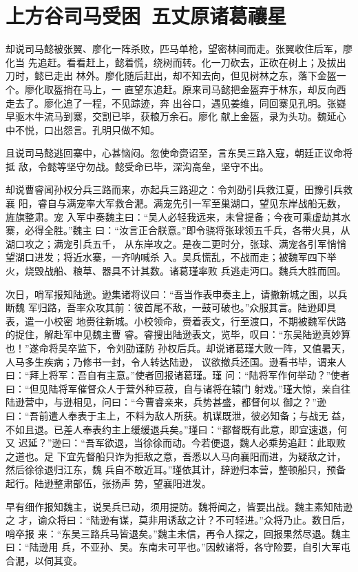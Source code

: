 \chapter{上方谷司马受困~五丈原诸葛禳星}

却说司马懿被张翼、廖化一阵杀败，匹马单枪，望密林间而走。张翼收住后军，廖化当
先追赶。看看赶上，懿着慌，绕树而转。化一刀砍去，正砍在树上；及拔出刀时，懿已走出
林外。廖化随后赶出，却不知去向，但见树林之东，落下金盔一个。廖化取盔捎在马上，一
直望东追赶。原来司马懿把金盔弃于林东，却反向西走去了。廖化追了一程，不见踪迹，奔
出谷口，遇见姜维，同回寨见孔明。张嶷早驱木牛流马到寨，交割已毕，获粮万余石。廖化
献上金盔，录为头功。魏延心中不悦，口出怨言。孔明只做不知。

且说司马懿逃回寨中，心甚恼闷。忽使命赍诏至，言东吴三路入寇，朝廷正议命将抵
敌，令懿等坚守勿战。懿受命已毕，深沟高垒，坚守不出。

却说曹睿闻孙权分兵三路而来，亦起兵三路迎之：令刘劭引兵救江夏，田豫引兵救襄
阳，睿自与满宠率大军救合淝。满宠先引一军至巢湖口，望见东岸战船无数，旌旗整肃。宠
入军中奏魏主曰：“吴人必轻我远来，未曾提备；今夜可乘虚劫其水寨，必得全胜。”魏主
曰：“汝言正合朕意。”即令骁将张球领五千兵，各带火具，从湖口攻之；满宠引兵五千，
从东岸攻之。是夜二更时分，张球、满宠各引军悄悄望湖口进发；将近水寨，一齐呐喊杀
入。吴兵慌乱，不战而走；被魏军四下举火，烧毁战船、粮草、器具不计其数。诸葛瑾率败
兵逃走沔口。魏兵大胜而回。

次日，哨军报知陆逊。逊集诸将议曰：“吾当作表申奏主上，请撤新城之围，以兵断魏
军归路，吾率众攻其前：彼首尾不敌，一鼓可破也。”众服其言。陆逊即具表，遣一小校密
地赍往新城。小校领命，赍着表文，行至渡口，不期被魏军伏路的捉住，解赴军中见魏主曹
睿。睿搜出陆逊表文，览毕，叹曰：“东吴陆逊真妙算也！”遂命将吴卒监下，令刘劭谨防
孙权后兵。却说诸葛瑾大败一阵，又值暑天，人马多生疾病；乃修书一封，令人转达陆逊，
议欲撤兵还国。逊看书毕，谓来人曰：“拜上将军：吾自有主意。”使者回报诸葛瑾。瑾
问：“陆将军作何举动？”使者曰：“但见陆将军催督众人于营外种豆菽，自与诸将在辕门
射戏。”瑾大惊，亲自往陆逊营中，与逊相见，问曰：“今曹睿亲来，兵势甚盛，都督何以
御之？”逊曰：“吾前遣人奉表于主上，不料为敌人所获。机谋既泄，彼必知备；与战无
益，不如且退。已差人奉表约主上缓缓退兵矣。”瑾曰：“都督既有此意，即宜速退，何又
迟延？”逊曰：“吾军欲退，当徐徐而动。今若便退，魏人必乘势追赶：此取败之道也。足
下宜先督船只诈为拒敌之意，吾悉以人马向襄阳而进，为疑敌之计，然后徐徐退归江东，魏
兵自不敢近耳。”瑾依其计，辞逊归本营，整顿船只，预备起行。陆逊整肃部伍，张扬声
势，望襄阳进发。

早有细作报知魏主，说吴兵已动，须用提防。魏将闻之，皆要出战。魏主素知陆逊之
才，谕众将曰：“陆逊有谋，莫非用诱敌之计？不可轻进。”众将乃止。数日后，哨卒报
来：“东吴三路兵马皆退矣。”魏主未信，再令人探之，回报果然尽退。魏主曰：“陆逊用
兵，不亚孙、吴。东南未可平也。”因敕诸将，各守险要，自引大军屯合淝，以伺其变。

